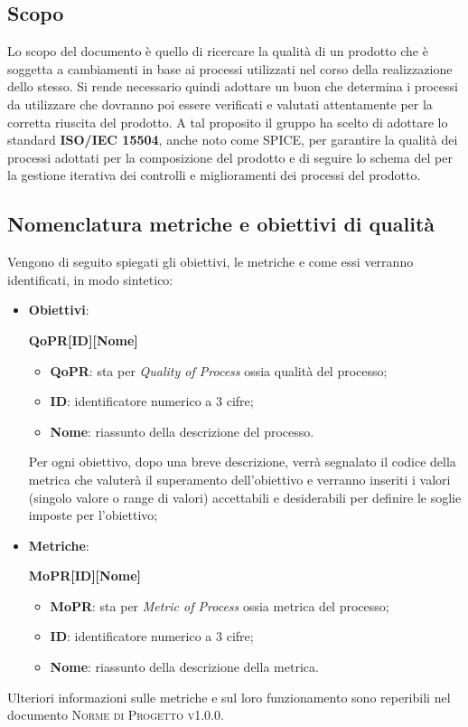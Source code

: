 \documentclass[../piano-di-qualifica.tex]{subfiles}
\begin{document}
\subsection{Scopo}%
\label{sub:scopo}
Lo scopo del documento è quello di ricercare la qualità di un prodotto che è soggetta a cambiamenti in base ai processi utilizzati nel corso della realizzazione dello stesso.
Si rende necessario quindi adottare un buon  che determina i processi da utilizzare che dovranno poi essere verificati e valutati attentamente per la corretta riuscita del prodotto.
A tal proposito il gruppo ha scelto di adottare lo standard \textbf{ISO/IEC 15504}, anche noto come SPICE, per garantire la qualità dei processi adottati per la composizione del prodotto e di seguire lo schema del  per la gestione iterativa dei controlli e miglioramenti dei processi del prodotto.

\subsection{Nomenclatura metriche e obiettivi di qualità}%
\label{sub:nomenclatura_metriche_e_obiettivi_di_qualita}
Vengono di seguito spiegati gli obiettivi, le metriche e come essi verranno identificati, in modo sintetico:
\begin{itemize}
    \item \textbf{Obiettivi}: 
    \begin{center}
        \centering
        \textbf{QoPR[ID][Nome]}
    \end{center}
        \begin{itemize}
            \item \textbf{QoPR}: sta per \textit{Quality of Process} ossia qualità del processo;
            \item \textbf{ID}: identificatore numerico a 3 cifre;
            \item \textbf{Nome}: riassunto della descrizione del processo.
        \end{itemize}
        Per ogni obiettivo, dopo una breve descrizione, verrà segnalato il codice della metrica che valuterà il superamento dell'obiettivo e verranno inseriti i valori (singolo valore o range di valori) accettabili e desiderabili per definire le soglie imposte per l'obiettivo;
    \item \textbf{Metriche}: 
    \begin{center}
        \centering
        \textbf{MoPR[ID][Nome]}
    \end{center}
        \begin{itemize}
            \item \textbf{MoPR}: sta per \textit{Metric of Process} ossia metrica del processo;
            \item \textbf{ID}: identificatore numerico a 3 cifre;
            \item \textbf{Nome}: riassunto della descrizione della metrica.
        \end{itemize}
\end{itemize}  
Ulteriori informazioni sulle metriche e sul loro funzionamento sono reperibili nel documento \textsc{Norme di Progetto v1.0.0}.
\end{document}

